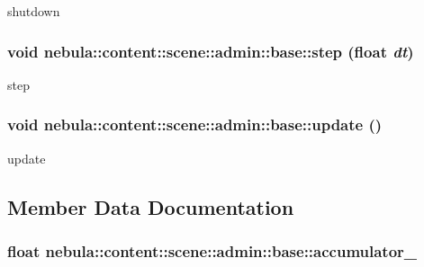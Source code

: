 shutdown \hypertarget{classnebula_1_1content_1_1scene_1_1admin_1_1base_af8961092528aad52d1a9414a29b26ffb}{
\subsubsection[{step}]{\setlength{\rightskip}{0pt plus 5cm}void nebula::content::scene::admin::base::step (float {\em dt})}}
\label{classnebula_1_1content_1_1scene_1_1admin_1_1base_af8961092528aad52d1a9414a29b26ffb}


step \hypertarget{classnebula_1_1content_1_1scene_1_1admin_1_1base_a04559582f1549c9cece3c09de4016c24}{
\subsubsection[{update}]{\setlength{\rightskip}{0pt plus 5cm}void nebula::content::scene::admin::base::update ()}}
\label{classnebula_1_1content_1_1scene_1_1admin_1_1base_a04559582f1549c9cece3c09de4016c24}


update 

\subsection{Member Data Documentation}
\hypertarget{classnebula_1_1content_1_1scene_1_1admin_1_1base_a528fa59c8e53e163df45cccd014acb92}{
\subsubsection[{accumulator\_\-}]{\setlength{\rightskip}{0pt plus 5cm}float {\bf nebula::content::scene::admin::base::accumulator\_\-}}}
\label{classnebula_1_1content_1_1scene_1_1admin_1_1base_a528fa59c8e53e163df45cccd014acb92}


